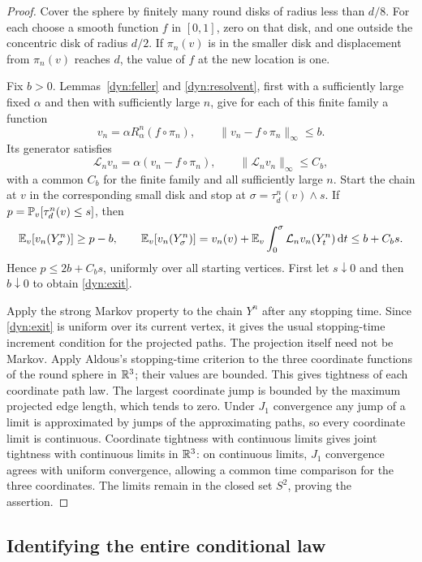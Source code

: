 \begin{proof}
Cover the sphere by finitely many round disks of radius less than
$d/8$.  For each choose a smooth function $f$ in $[0,1]$, zero on
that disk, and one outside the concentric disk of radius $d/2$.
If $\pi_n(v)$ is in the smaller disk and displacement from
$\pi_n(v)$ reaches $d$, the value of $f$ at the new location is one.

Fix $b>0$.  Lemmas~\ref{dyn:feller} and \ref{dyn:resolvent}, first
with a sufficiently large fixed $\alpha$ and then with sufficiently
large $n$, give for each of this finite family a function
\[
 v_n=\alpha R^n_\alpha(f\circ\pi_n),\qquad
 \|v_n-f\circ\pi_n\|_\infty\le b.
\]
Its generator satisfies
\[
 \mathcal L_nv_n=\alpha(v_n-f\circ\pi_n),
 \qquad \|\mathcal L_nv_n\|_\infty\le C_b,
\]
with a common $C_b$ for the finite family and all sufficiently large
$n$.  Start the chain at $v$ in the corresponding small disk and
stop at $\sigma=\tau^n_d(v)\wedge s$.  If
$p=\P_v[\tau^n_d(v)\le s]$, then
\[
 \E_v[v_n(Y^n_\sigma)]\ge p-b,
 \qquad
 \E_v[v_n(Y^n_\sigma)]
   =v_n(v)+\E_v\int_0^\sigma \mathcal L_nv_n(Y^n_t)\,\dd t
   \le b+C_bs.
\]
Hence $p\le2b+C_bs$, uniformly over all starting vertices.
First let $s\downarrow0$ and then $b\downarrow0$ to obtain
\eqref{dyn:exit}.

Apply the strong Markov property to the chain $Y^n$ after any
stopping time.  Since \eqref{dyn:exit} is uniform over its current
vertex, it gives the usual stopping-time increment condition for
the projected paths.  The projection itself need not be Markov.
Apply Aldous's stopping-time criterion \cite{Aldous} to the three
coordinate functions of the round sphere in $\R^3$; their values
are bounded.  This gives tightness of each coordinate path law.
The largest coordinate jump is bounded by the maximum projected
edge length, which tends to zero.  Under $J_1$ convergence any jump
of a limit is approximated by jumps of the approximating paths,
so every coordinate limit is continuous.  Coordinate tightness
with continuous limits gives joint tightness with continuous
limits in $\R^3$: on continuous limits, $J_1$ convergence agrees
with uniform convergence, allowing a common time comparison for
the three coordinates.  The limits remain in the closed set
$S^2$, proving the assertion.
\end{proof}

\subsection{Identifying the entire conditional law}

